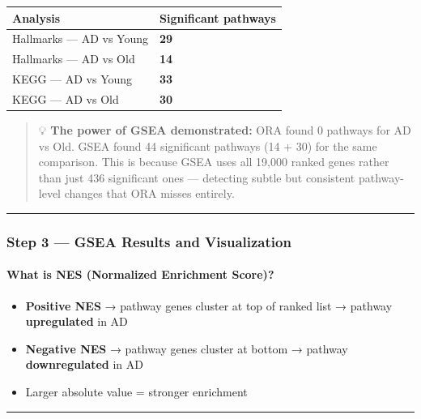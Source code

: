 \documentclass[
]{article}
\providecommand{\tightlist}{%
  \setlength{\itemsep}{0pt}\setlength{\parskip}{0pt}}
\begin{document}
\begin{longtable}[]{@{}ll@{}}
\toprule\noalign{}
Analysis & Significant pathways \\
\midrule\noalign{}
\endhead
\bottomrule\noalign{}
\endlastfoot
Hallmarks --- AD vs Young & \textbf{29} \\
Hallmarks --- AD vs Old & \textbf{14} \\
KEGG --- AD vs Young & \textbf{33} \\
KEGG --- AD vs Old & \textbf{30} \\
\end{longtable}

\begin{quote}
💡 \textbf{The power of GSEA demonstrated:} ORA found 0 pathways for AD
vs Old. GSEA found 44 significant pathways (14 + 30) for the same
comparison. This is because GSEA uses all 19,000 ranked genes rather
than just 436 significant ones --- detecting subtle but consistent
pathway-level changes that ORA misses entirely.
\end{quote}

\begin{center}\rule{0.5\linewidth}{0.5pt}\end{center}

\subsubsection{Step 3 --- GSEA Results and
Visualization}\label{step-3-gsea-results-and-visualization}

\paragraph{What is NES (Normalized Enrichment
Score)?}\label{what-is-nes-normalized-enrichment-score}

\begin{itemize}
\tightlist
\item
  \textbf{Positive NES} → pathway genes cluster at top of ranked list →
  pathway \textbf{upregulated} in AD
\item
  \textbf{Negative NES} → pathway genes cluster at bottom → pathway
  \textbf{downregulated} in AD
\item
  Larger absolute value = stronger enrichment
\end{itemize}

\begin{center}\rule{0.5\linewidth}{0.5pt}\end{center}
\end{document}
